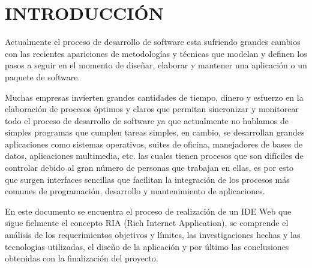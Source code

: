 \section{INTRODUCCIÓN}

Actualmente el proceso de desarrollo de software esta sufriendo grandes cambios con las recientes apariciones de metodologías y técnicas que modelan y definen los pasos a seguir en el momento de diseñar, elaborar y mantener una aplicación o un paquete de software.

Muchas empresas invierten grandes cantidades de tiempo, dinero y esfuerzo en la elaboración de procesos óptimos y claros que permitan sincronizar y monitorear todo el proceso de desarrollo de software ya que actualmente no hablamos de simples programas que cumplen tareas simples, en cambio, se desarrollan grandes aplicaciones como sistemas operativos, suites de oficina, manejadores de bases de datos, aplicaciones multimedia, etc. las cuales tienen procesos que son difíciles de controlar debido al gran número de personas que trabajan en ellas, es por esto que surgen interfaces sencillas que facilitan la integración de los procesos más comunes de programación, desarrollo y mantenimiento de aplicaciones.

En este documento se encuentra el proceso de realización de un IDE Web que sigue fielmente el concepto RIA (Rich Internet Application), se comprende el análisis de los requerimientos objetivos y límites, las investigaciones hechas y las tecnologias utilizadas, el diseño de la aplicación y por último las conclusiones obtenidas con la finalización del proyecto.

